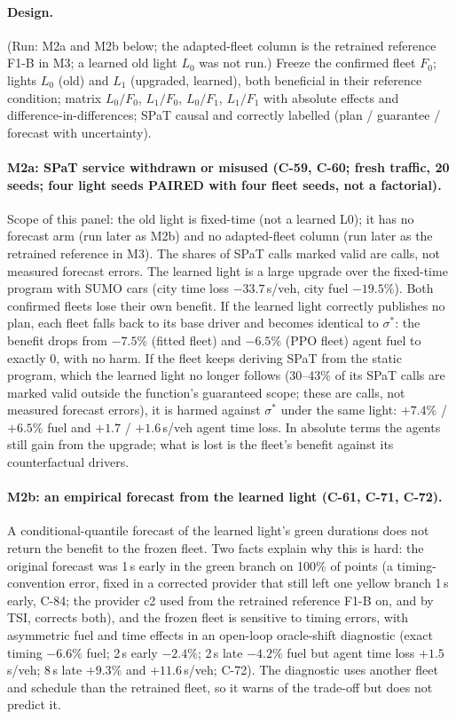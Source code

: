 \documentclass[11pt]{article}
\begin{document}
\paragraph{Design.} (Run: M2a and M2b below; the adapted-fleet column is the retrained reference F1-B in M3; a learned old light $L_0$
was not run.) Freeze the confirmed fleet $F_0$; lights $L_0$ (old) and $L_1$ (upgraded, learned), both beneficial in their
reference condition; matrix $L_0/F_0$, $L_1/F_0$, $L_0/F_1$, $L_1/F_1$ with absolute effects and difference-in-differences; SPaT
causal and correctly labelled (plan / guarantee / forecast with uncertainty).
\paragraph{M2a: SPaT service withdrawn or misused (C-59, C-60; fresh traffic, 20 seeds; four light seeds PAIRED with four fleet
seeds, not a factorial).} Scope of this panel: the old light is fixed-time (not a learned L0); it has no forecast arm (run later as M2b)
and no adapted-fleet column (run later as the retrained reference in M3). The shares of SPaT calls marked valid are calls, not measured forecast errors. The learned light is a large
upgrade over the fixed-time program with SUMO cars (city time loss $-33.7$\,s/veh, city fuel $-19.5\%$). Both confirmed fleets lose their
own benefit. If the learned light correctly publishes no plan, each fleet falls back to its base driver and becomes identical to
$\sigma^*$: the benefit drops from $-7.5\%$ (fitted fleet) and $-6.5\%$ (PPO fleet) agent fuel to exactly 0, with no harm. If the fleet
keeps deriving SPaT from the static program, which the learned light no longer follows (30--43\% of its SPaT calls are marked valid
outside the function's guaranteed scope; these are calls, not measured forecast errors), it is harmed against $\sigma^*$ under the same light: $+7.4\%$ / $+6.5\%$ fuel and $+1.7$ / $+1.6$\,s/veh agent time loss. In
absolute terms the agents still gain from the upgrade; what is lost is the fleet's benefit against its counterfactual drivers.
\paragraph{M2b: an empirical forecast from the learned light (C-61, C-71, C-72).} A conditional-quantile forecast of the learned light's
green durations does not return the benefit to the frozen fleet. Two facts explain why this is hard: the original forecast was 1\,s early in
the green branch on 100\% of points (a timing-convention error, fixed in a corrected provider that still left one yellow branch 1\,s early, C-84; the provider c2 used from
the retrained reference F1-B on, and by TSI, corrects both),
and the frozen fleet is sensitive to timing errors, with asymmetric fuel and time effects in an open-loop oracle-shift diagnostic (exact
timing $-6.6\%$ fuel; 2\,s early $-2.4\%$; 2\,s late $-4.2\%$ fuel but agent time loss $+1.5$\,s/veh; 8\,s late $+9.3\%$ and $+11.6$\,s/veh;
C-72). The diagnostic uses another fleet and schedule than the retrained fleet, so it warns of the trade-off but does not predict it.
\end{document}
